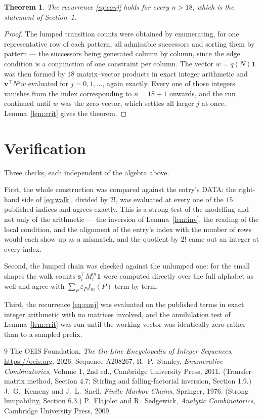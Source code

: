\documentclass[11pt,a4paper]{article}
\theoremstyle{plain}
\newtheorem{theorem}{Theorem}
\theoremstyle{definition}
\begin{document}
\begin{theorem}
The recurrence \eqref{eq:conj} holds for every $n>18$, which is the statement of
Section~1.
\end{theorem}

\begin{proof}
The lumped transition counts were obtained by enumerating, for one representative row of
each pattern, all admissible successors and sorting them by pattern --- the successors being
generated column by column, since the edge condition is a conjunction of one constraint per
column. The vector $w=q(N)\mathbf{1}$ was then formed by $18$ matrix--vector products
in exact integer arithmetic and $\mathbf{v}^{\!\top}N^{j}w$ evaluated for
$j=0,1,\dots$, again exactly. Every one of those integers vanishes from the index
corresponding to $n=18+1$ onwards, and the run continued until $w$ was the zero vector,
which settles all larger $j$ at once. Lemma~\ref{lem:crit} gives the theorem.
\end{proof}

\section{Verification}

Three checks, each independent of the algebra above.

First, the whole construction was compared against the entry's DATA: the right-hand side of
\eqref{eq:walk}, divided by $2!$, was evaluated at every one of the $15$
published indices and agrees exactly. This is a strong test of the modelling and not only of
the arithmetic --- the inversion of Lemma~\ref{lem:inv}, the reading of the local
condition, and the alignment of the entry's index with the number of rows would each
show up as a mismatch, and the quotient by $2!$ came out an integer at every index.

Second, the lumped chain was checked against the unlumped one: for the small shapes the walk
counts $\mathbf{s}_i^{\!\top}M_i^{m}\mathbf{1}$ were computed directly over the full
alphabet as well and agree with $\sum_P\varepsilon_Pf_m(P)$ term by term.

Third, the recurrence \eqref{eq:conj} was evaluated on the published terms in exact integer
arithmetic with no matrices involved, and the annihilation test of Lemma~\ref{lem:crit} was
run until the working vector was identically zero rather than to a sampled prefix.

\begin{thebibliography}{9}
 The OEIS Foundation, \emph{The On-Line Encyclopedia of Integer
Sequences}, \url{https://oeis.org}, 2026. Sequence A208267.
 R.~P.~Stanley, \emph{Enumerative Combinatorics}, Volume 1, 2nd ed.,
Cambridge University Press, 2011. (Transfer-matrix method, Section 4.7; Stirling and
falling-factorial inversion, Section 1.9.)
 J.~G.~Kemeny and J.~L.~Snell, \emph{Finite Markov Chains}, Springer,
1976. (Strong lumpability, Section 6.3.)
 P.~Flajolet and R.~Sedgewick, \emph{Analytic Combinatorics}, Cambridge
University Press, 2009.
\end{thebibliography}
\end{document}
